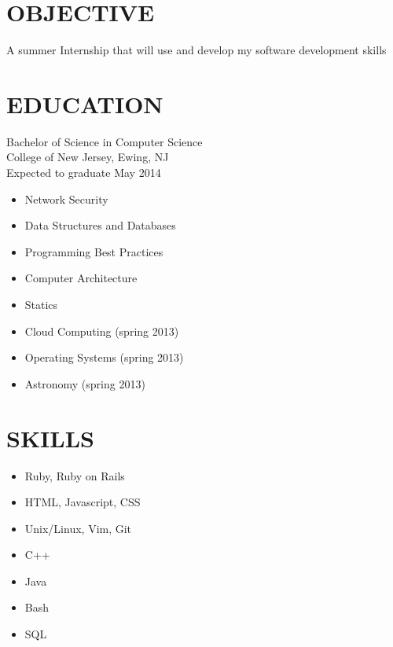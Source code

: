 \documentclass[line, margin]{res}
\begin{document}
  \address{63 Villa Ave.\\ Pitman, NJ 08071\\ (609)-670-5137}

  \begin{resume}
    \section{OBJECTIVE}
    A summer Internship that will use and develop my software development skills
    \section{EDUCATION}
    Bachelor of Science in Computer Science \\
    College of New Jersey, Ewing, NJ \\
    Expected to graduate May 2014
    \begin{itemize}
        \item Network Security
        \item Data Structures and Databases
        \item Programming Best Practices
        \item Computer Architecture
        \item Statics
        \item Cloud Computing (spring 2013)
        \item Operating Systems (spring 2013)
        \item Astronomy (spring 2013)
    \end{itemize}
    \section{SKILLS}
    \begin{itemize}
        \item Ruby, Ruby on Rails
        \item HTML, Javascript, CSS
        \item Unix/Linux, Vim, Git
        \item C++
        \item Java
        \item Bash
        \item SQL
    \end{itemize}

\end{resume}
\end{document}
